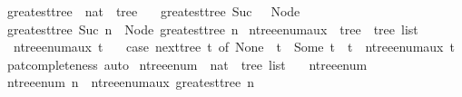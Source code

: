 \begin{isabellebox}
    \isamarkupfalse%
    \ greatest{\isacharunderscore}{\kern0pt}tree\ {\isacharcolon}{\kern0pt}{\isacharcolon}{\kern0pt}\ {\isachardoublequoteopen}nat\ {\isasymRightarrow}\ tree{\isachardoublequoteclose}\ \isanewline
    \ \ {\isachardoublequoteopen}greatest{\isacharunderscore}{\kern0pt}tree\ {\isacharparenleft}{\kern0pt}Suc\ {}{\isacharparenright}{\kern0pt}\ {\isacharequal}{\kern0pt}\ Node\ {\isacharbrackleft}{\kern0pt}{\isacharbrackright}{\kern0pt}{\isachardoublequoteclose}\isanewline
    {\isacharbar}{\kern0pt}\ {\isachardoublequoteopen}greatest{\isacharunderscore}{\kern0pt}tree\ {\isacharparenleft}{\kern0pt}Suc\ n{\isacharparenright}{\kern0pt}\ {\isacharequal}{\kern0pt}\ Node\ {\isacharbrackleft}{\kern0pt}greatest{\isacharunderscore}{\kern0pt}tree\ n{\isacharbrackright}{\kern0pt}{\isachardoublequoteclose}\isanewline
    \isanewline
    \isamarkupfalse%
    \ n{\isacharunderscore}{\kern0pt}tree{\isacharunderscore}{\kern0pt}enum{\isacharunderscore}{\kern0pt}aux\ {\isacharcolon}{\kern0pt}{\isacharcolon}{\kern0pt}\ {\isachardoublequoteopen}tree\ {\isasymRightarrow}\ tree\ list{\isachardoublequoteclose}\ \isanewline
    \ \ {\isachardoublequoteopen}n{\isacharunderscore}{\kern0pt}tree{\isacharunderscore}{\kern0pt}enum{\isacharunderscore}{\kern0pt}aux\ t\ {\isacharequal}{\kern0pt}\isanewline
    \ \ {\isacharparenleft}{\kern0pt}case\ next{\isacharunderscore}{\kern0pt}tree\ t\ of\ None\ {\isasymRightarrow}\ {\isacharbrackleft}{\kern0pt}t{\isacharbrackright}{\kern0pt}\ {\isacharbar}{\kern0pt}\ Some\ t{\isacharprime}{\kern0pt}\ {\isasymRightarrow}\ t\ {\isacharhash}{\kern0pt}\ n{\isacharunderscore}{\kern0pt}tree{\isacharunderscore}{\kern0pt}enum{\isacharunderscore}{\kern0pt}aux\ t{\isacharprime}{\kern0pt}{\isacharparenright}{\kern0pt}{\isachardoublequoteclose}\isanewline
    \isamarkupfalse%
    \ pat{\isacharunderscore}{\kern0pt}completeness\ auto%
    \isanewline\isanewline
    \isamarkupfalse%
    \ n{\isacharunderscore}{\kern0pt}tree{\isacharunderscore}{\kern0pt}enum\ {\isacharcolon}{\kern0pt}{\isacharcolon}{\kern0pt}\ {\isachardoublequoteopen}nat\ {\isasymRightarrow}\ tree\ list{\isachardoublequoteclose}\ \isanewline
    \ \ {\isachardoublequoteopen}n{\isacharunderscore}{\kern0pt}tree{\isacharunderscore}{\kern0pt}enum\ {}\ {\isacharequal}{\kern0pt}\ {\isacharbrackleft}{\kern0pt}{\isacharbrackright}{\kern0pt}{\isachardoublequoteclose}\isanewline
    {\isacharbar}{\kern0pt}\ {\isachardoublequoteopen}n{\isacharunderscore}{\kern0pt}tree{\isacharunderscore}{\kern0pt}enum\ n\ {\isacharequal}{\kern0pt}\ n{\isacharunderscore}{\kern0pt}tree{\isacharunderscore}{\kern0pt}enum{\isacharunderscore}{\kern0pt}aux\ {\isacharparenleft}{\kern0pt}greatest{\isacharunderscore}{\kern0pt}tree\ n{\isacharparenright}{\kern0pt}{\isachardoublequoteclose}
\end{isabellebox}

